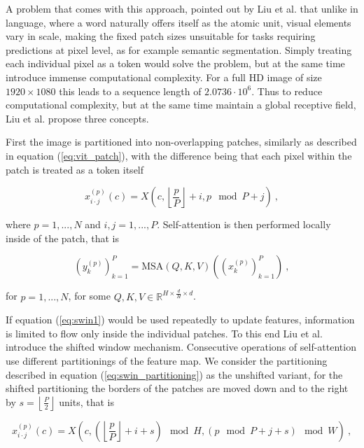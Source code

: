 A problem that comes with this approach, 
pointed out by Liu et al. \cite{liuSwinTransformerHierarchical2021}
that unlike in language, where a word naturally offers itself as the atomic unit,
visual elements vary in scale,
making the fixed patch sizes unsuitable for tasks requiring predictions at pixel level,
as for example semantic segmentation. 
Simply treating each individual pixel as a token would solve the problem,
but at the same time introduce immense computational complexity.
For a full HD image of size $1920 \times 1080$ this leads to a sequence length of $2.0736 \cdot 10^{6}$.
Thus to reduce computational complexity,
but at the same time maintain a global receptive field, Liu et al. \cite{liuSwinTransformerHierarchical2021} propose three concepts.

First the image is partitioned into non-overlapping patches,
similarly as described in equation (\ref{eq:vit_patch}),
with the difference being that each pixel within the patch is treated as a token itself

    \begin{equation} \label{eq:swin_partitioning}
        x_{i \cdot j}^{(p)}(c) = X \left( c, \left\lfloor \frac{p}{P} \right\rfloor + i, p \mod P + j \right) ~,
    \end{equation}

where $p = 1, ..., N$ and $i, j = 1, ..., P$. 
Self-attention is then performed locally inside of the patch, 
that is

    \begin{equation} \label{eq:swin1}
        (y_{k}^{(p)})_{k=1}^P = \text{MSA}(Q, K, V) \left( (x_{k}^{(p)})_{k=1}^P \right) ~,
    \end{equation}

for $p = 1, ..., N$, for some $Q, K, V \in \mathbb R^{H \times \frac{d}{H} \times d}$.

If equation (\ref{eq:swin1}) would be used repeatedly to update features,
information is limited to flow only inside the individual patches. 
To this end Liu et al. \cite{liuSwinTransformerHierarchical2021} introduce the shifted window mechanism.
Consecutive operations of self-attention use different partitionings of the feature map.
We consider the partitioning described in equation (\ref{eq:swin_partitioning}) as the unshifted variant,
for the shifted partitioning the borders of the patches are moved down and to the right by $s = \left \lfloor \frac{P}{2} \right \rfloor$ units,
that is

    \begin{equation*}
        x_{i \cdot j}^{(p)}(c) = X \left( c, \left(\left\lfloor \frac{p}{P} \right\rfloor + i + s \right) \mod H, \left( p \mod P + j + s \right) \mod W \right) ~,
    \end{equation*}

